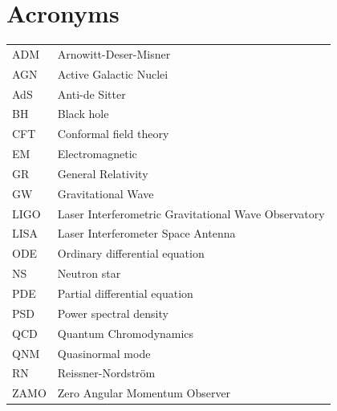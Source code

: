 \documentclass[11pt]{article}
\numberwithin{equation}{section} %
\begin{document}
\section*{Acronyms}
\begin{tabular}{ll}
ADM    & Arnowitt-Deser-Misner                                \\
AGN    & Active Galactic Nuclei				\\
AdS    & Anti-de Sitter                                       \\
BH     & Black hole                                           \\
CFT    & Conformal field theory                                 \\
EM     & Electromagnetic                                      \\
GR     & General Relativity                                   \\ 
GW     & Gravitational Wave                                   \\
LIGO   & Laser Interferometric Gravitational Wave Observatory \\
LISA   & Laser Interferometer Space Antenna   \\
ODE    & Ordinary differential equation                       \\
NS     & Neutron star                                        \\
PDE    & Partial differential equation                        \\
PSD    & Power spectral density  \\ 
QCD    & Quantum Chromodynamics                               \\
QNM    & Quasinormal mode                                     \\
RN     & Reissner-Nordstr\"om				      \\
ZAMO   & Zero Angular Momentum Observer
\end{tabular}
%
\end{document}

